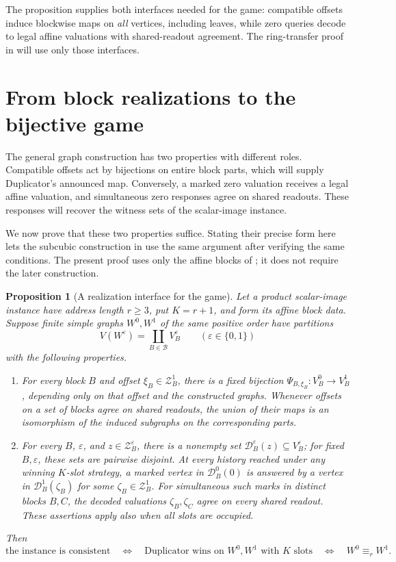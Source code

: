\documentclass[11pt]{article}
\newtheorem{proposition}[theorem]{Proposition}
\theoremstyle{definition}
\begin{document}
The proposition supplies both interfaces needed for the game:
compatible offsets induce blockwise maps on \emph{all} vertices,
including leaves, while zero queries decode to legal affine
valuations with shared-readout agreement. The ring-transfer proof
in  will use only those interfaces.

\section{From block realizations to the bijective game}
\label{reduction:section}

The general graph construction has two properties with different roles.
Compatible offsets act by bijections on entire block parts, which will
supply Duplicator's announced map. Conversely, a marked zero valuation
receives a legal affine valuation, and simultaneous zero responses agree
on shared readouts. These responses will recover the witness sets of
the scalar-image instance.

We now prove that these two properties suffice. Stating their precise
form here lets the subcubic construction in  use
the same argument after verifying the same conditions. The present
proof uses only the affine blocks of ; it does
not require the later construction.

\begin{proposition}[A realization interface for the game]
\label{prop:game-reduction}
Let a product scalar-image instance have address length \(r\ge3\),
put \(K=r+1\), and form its affine block data. Suppose finite simple
graphs \(W^0,W^1\) of the same positive order have partitions
\[
 V(W^\varepsilon)=\coprod_{B\in\mathcal B}V_B^\varepsilon
 \qquad(\varepsilon\in\{0,1\})
\]
with the following properties.
\begin{enumerate}
\item\label{item:game-local-maps}
For every block \(B\) and offset \(\xi_B\in\mathcal Z_B^1\), there is a
fixed bijection
\(\Psi_{B,\xi_B}:V_B^0\to V_B^1\), depending only on that offset
and the constructed graphs. Whenever offsets on a set of blocks agree
on shared readouts, the union of their maps is an isomorphism of the
induced subgraphs on the corresponding parts.
\item\label{item:game-zero-decoding}
For every \(B\), \(\varepsilon\), and \(z\in\mathcal Z_B^\varepsilon\), there is a
nonempty set \(\mathcal D_B^\varepsilon(z)\subseteq V_B^\varepsilon\); for fixed
\(B,\varepsilon\), these sets are pairwise disjoint. At every history
reached under any winning \(K\)-slot strategy, a marked vertex in
\(\mathcal D_B^0(0)\) is answered by a vertex in
\(\mathcal D_B^1(\zeta_B)\) for some \(\zeta_B\in\mathcal Z_B^1\).
For simultaneous such marks in distinct blocks \(B,C\), the decoded
valuations \(\zeta_B,\zeta_C\) agree on every shared readout.
These assertions apply also when all slots are occupied.
\end{enumerate}
Then
\[
 \text{the instance is consistent}
 \quad\Longleftrightarrow\quad
 \text{Duplicator wins on \(W^0,W^1\) with \(K\) slots}
 \quad\Longleftrightarrow\quad W^0\equiv_r W^1.
\]
\end{proposition}
\end{document}
